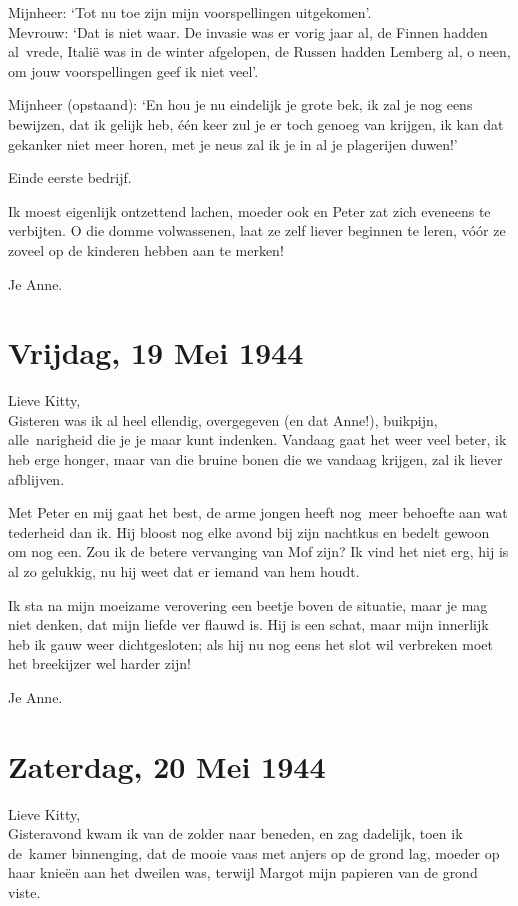 \documentclass{book}
\begin{document}
Mijnheer: `Tot nu toe zijn mijn voorspellingen uitgekomen'.\\
Mevrouw: `Dat is
niet waar. De invasie was er vorig jaar al, de Finnen hadden al~vrede, Italië
was in de winter afgelopen, de Russen hadden Lemberg al, o neen, om jouw
voorspellingen geef ik niet veel'.

Mijnheer (opstaand): `En hou je nu eindelijk je grote bek, ik zal je nog eens
bewijzen, dat ik gelijk heb, één keer zul je er toch genoeg van krijgen, ik kan
dat gekanker niet meer horen, met je neus zal ik je in al je plagerijen duwen!'

Einde eerste bedrijf.

Ik moest eigenlijk ontzettend lachen, moeder ook en Peter zat zich eveneens te
verbijten. O die domme volwassenen, laat ze zelf liever beginnen te leren, vóór
ze zoveel op de kinderen hebben aan te merken!

Je Anne.

\section*{Vrijdag, 19 Mei 1944}

Lieve Kitty,\\
Gisteren was ik al heel ellendig, overgegeven (en dat Anne!),
buikpijn, alle~narigheid die je je maar kunt indenken. Vandaag gaat het weer
veel beter, ik heb erge honger, maar van die bruine bonen die we vandaag
krijgen, zal ik liever afblijven.

Met Peter en mij gaat het best, de arme jongen heeft nog~meer behoefte aan wat
tederheid dan ik. Hij bloost nog elke avond bij zijn nachtkus en bedelt gewoon
om nog een. Zou ik de betere vervanging van Mof zijn? Ik vind het niet erg, hij
is al zo gelukkig, nu hij weet dat er iemand van hem houdt.

Ik sta na mijn moeizame verovering een beetje boven de situatie, maar je mag
niet denken, dat mijn liefde ver flauwd is. Hij is een schat, maar mijn
innerlijk heb ik gauw weer dichtgesloten; als hij nu nog eens het slot wil
verbreken moet het breekijzer wel harder zijn!

Je Anne.

\section*{Zaterdag, 20 Mei 1944}

Lieve Kitty,\\
Gisteravond kwam ik van de zolder naar beneden, en zag dadelijk,
toen ik de~kamer binnenging, dat de mooie vaas met anjers op de grond lag,
moeder op haar knieën aan het dweilen was, terwijl Margot mijn papieren van de
grond viste.
\end{document}
